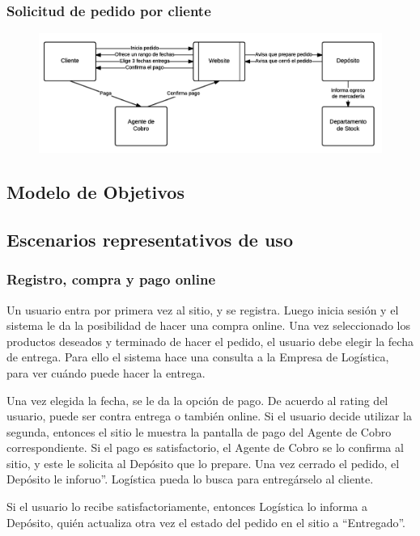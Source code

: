     \clearpage
    \subsubsection{Solicitud de pedido por cliente}
    \begin{figure}[H]
      \includegraphics[width=\linewidth]{images/solicitud-de-pedido-por-cliente.png}
    \end{figure}

  \clearpage
  \subsection{Modelo de Objetivos}
  \fixme
  
  \newpage
  \subsection{Escenarios representativos de uso}
    
    \subsubsection{Registro, compra y pago online}

    Un usuario entra por primera vez al sitio, y se registra. Luego inicia sesión y el sistema le da la posibilidad de hacer una compra online. Una vez seleccionado los productos deseados y terminado de hacer el pedido, el usuario debe elegir la fecha de entrega. Para ello el sistema hace una consulta a la Empresa de Logística, para ver cuándo puede hacer la entrega. 
    
    Una vez elegida la fecha, se le da la opción de pago. De acuerdo al rating del usuario, puede ser contra entrega o también online. Si el usuario decide utilizar la segunda, entonces el sitio le muestra la pantalla de pago del Agente de Cobro correspondiente. Si el pago es satisfactorio, el Agente de Cobro se lo confirma al sitio, y este le solicita al Depósito que lo prepare. Una vez cerrado el pedido, el Depósito le inforuo”. Logística pueda lo busca para entregárselo al cliente. 
    
    Si el usuario lo recibe satisfactoriamente, entonces Logística lo informa a Depósito, quién actualiza otra vez el estado del pedido en el sitio a “Entregado”. 


    \fixme